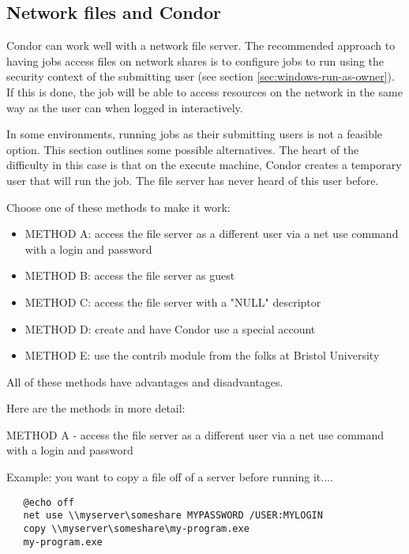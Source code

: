 \subsection{\label{sec:network-files-solutions}Network files and Condor}

Condor can work well with a network file server.  The recommended
approach to having jobs access files on network shares is to configure
jobs to run using the security context of the submitting user (see
section \ref{sec:windows-run-as-owner}).  If this is done, the job
will be able to access resources on the network in the same way as the
user can when logged in interactively.

In some environments, running jobs as their submitting users is not a
feasible option.  This section outlines some possible
alternatives. The heart of the difficulty in this case is that on the
execute machine, Condor creates a temporary user that will run the
job.  The file server has never heard of this user before.

Choose one of these methods to make it work:

\begin{itemize}
\item METHOD A: access the file server as a different user via a net use command
with a login and password
\item METHOD B: access the file server as guest
\item METHOD C: access the file server with a "NULL" descriptor
\item METHOD D: create and have Condor use a special account 
\item METHOD E: use the contrib module from the folks at Bristol University
\end{itemize}

All of these methods have advantages and disadvantages.

Here are the methods in more detail:

METHOD A - access the file server as a different user via a net use command 
with a login and password

Example: you want to copy a file off of a server before running it....

\footnotesize
\begin{verbatim}
   @echo off
   net use \\myserver\someshare MYPASSWORD /USER:MYLOGIN
   copy \\myserver\someshare\my-program.exe
   my-program.exe
\end{verbatim}
\normalsize

